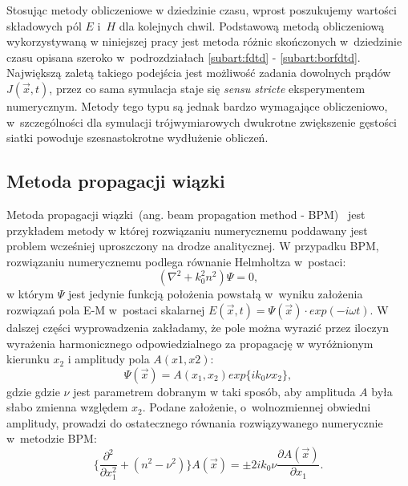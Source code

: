 Stosując metody obliczeniowe w dziedzinie czasu, wprost poszukujemy wartości składowych pól $E$ i~$H$ dla kolejnych chwil. Podstawową metodą obliczeniową wykorzystywaną w niniejszej pracy jest metoda różnic skończonych w~dziedzinie czasu opisana szeroko w~podrozdziałach \ref{subart:fdtd} - \ref{subart:borfdtd}. Największą zaletą takiego podejścia jest możliwość zadania dowolnych prądów $J(\vec{x},t)$, przez co sama symulacja staje się \textit{sensu stricte} eksperymentem numerycznym. Metody tego typu są jednak bardzo wymagające obliczeniowo, w~szczególności dla symulacji trójwymiarowych dwukrotne zwiększenie gęstości siatki powoduje szesnastokrotne wydłużenie obliczeń. 

\subsection{Metoda propagacji wiązki} 

Metoda propagacji wiązki~(ang. beam propagation method - BPM)~\cite{scarmozzino2000numerical,van1981beam} jest przykładem metody w której rozwiązaniu numerycznemu poddawany jest problem wcześniej uproszczony na drodze analitycznej. W przypadku BPM, rozwiązaniu numerycznemu podlega równanie Helmholtza w~postaci:
\begin{equation}
 ( \nabla ^2 + k_0^2 n^2 ) \Psi = 0,
\end{equation}
w którym $\Psi$ jest jedynie funkcją położenia powstałą w~wyniku założenia rozwiązań pola E-M w~postaci skalarnej $E(\vec{x},t)=\Psi(\vec{x})\cdot exp(-i\omega t)$. W dalszej części wyprowadzenia zakładamy, że pole można wyrazić przez iloczyn wyrażenia harmonicznego odpowiedzialnego za propagację w wyróżnionym kierunku $x_2$ i amplitudy pola $A(x1,x2)$:
\begin{equation}
\Psi(\vec{x})=A(x_1,x_2) exp\{ik_0\nu x_2\}, 
\end{equation}
gdzie gdzie $\nu$ jest parametrem dobranym w taki sposób, aby amplituda $A$ była słabo zmienna względem $x_2$. Podane założenie, o~wolnozmiennej obwiedni amplitudy, prowadzi do ostatecznego równania rozwiązywanego numerycznie w~metodzie BPM:
\begin{equation}
 \Big\{  \frac{\partial^2 }{\partial x_1^2 } + (n^2 - \nu^2) \Big\} A(\vec{x}) = \pm  2ik_0\nu \frac{\partial A (\vec{x})}{\partial x_1}.
\end{equation}

